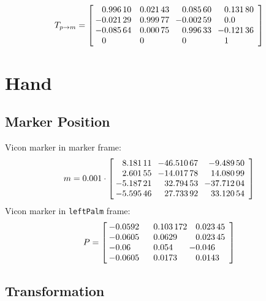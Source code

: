 \begin{equation}
T_{p \rightarrow m} = \begin{bmatrix}
\begin{array}{S[table-format=2.5]S[table-format=1.5]S[table-format=2.5]S[table-format=2.5]}
0.99610 & 0.02143 & 0.08560 & 0.13180 \\
-0.02129 & 0.99977 & -0.00259 & -0.0 \\
-0.08564 & 0.00075 & 0.99633 & -0.12136 \\
0 & 0 & 0 & 1
\end{array}
\end{bmatrix}
\end{equation}


\section{Hand}

\subsection{Marker Position}

Vicon marker in marker frame:
\begin{equation}
m = 0.001 \cdot \begin{bmatrix}
\begin{array}{S[table-format=2.5]S[table-format=3.5]S[table-format=3.5]}
8.18111 & -46.51067 & -9.48950 \\
2.60155 & -14.01778 & 14.08099 \\
-5.18721 & 32.79453 & -37.71204 \\
-5.59546 & 27.73392 & 33.12054
\end{array}
\end{bmatrix}
\end{equation}
%
Vicon marker in \texttt{leftPalm} frame:
\begin{equation}
P = \begin{bmatrix}
\begin{array}{S[table-format=2.5]S[table-format=1.5]S[table-format=2.5]}
-0.0592 & 0.103172 & 0.02345 \\
-0.0605 & 0.0629 & 0.02345 \\
-0.06 & 0.054 & -0.046 \\
-0.0605 & 0.0173 & 0.0143
\end{array}
\end{bmatrix}
\end{equation}

\subsection{Transformation}

